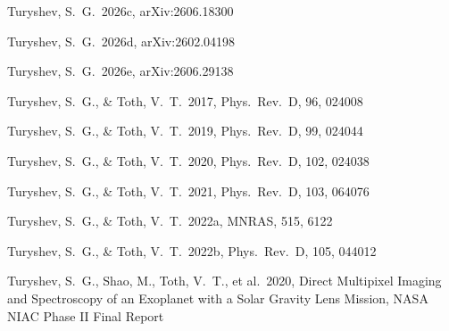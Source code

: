 \documentclass[twocolumn]{emulateapj}
\begin{document}
\begin{thebibliography}{}
Turyshev, S.~G.\ 2026c, arXiv:2606.18300

Turyshev, S.~G.\ 2026d, arXiv:2602.04198

Turyshev, S.~G.\ 2026e, arXiv:2606.29138

Turyshev, S.~G., \& Toth, V.~T.\ 2017, Phys.\ Rev.\ D, 96, 024008

Turyshev, S.~G., \& Toth, V.~T.\ 2019, Phys.\ Rev.\ D, 99, 024044

Turyshev, S.~G., \& Toth, V.~T.\ 2020, Phys.\ Rev.\ D, 102, 024038

Turyshev, S.~G., \& Toth, V.~T.\ 2021, Phys.\ Rev.\ D, 103, 064076

Turyshev, S.~G., \& Toth, V.~T.\ 2022a, MNRAS, 515, 6122

Turyshev, S.~G., \& Toth, V.~T.\ 2022b, Phys.\ Rev.\ D, 105, 044012

Turyshev, S.~G., Shao, M., Toth, V.~T., et al.\ 2020, Direct Multipixel Imaging and Spectroscopy of an Exoplanet with a Solar Gravity Lens Mission, NASA NIAC Phase II Final Report

\end{thebibliography}
\end{document}
